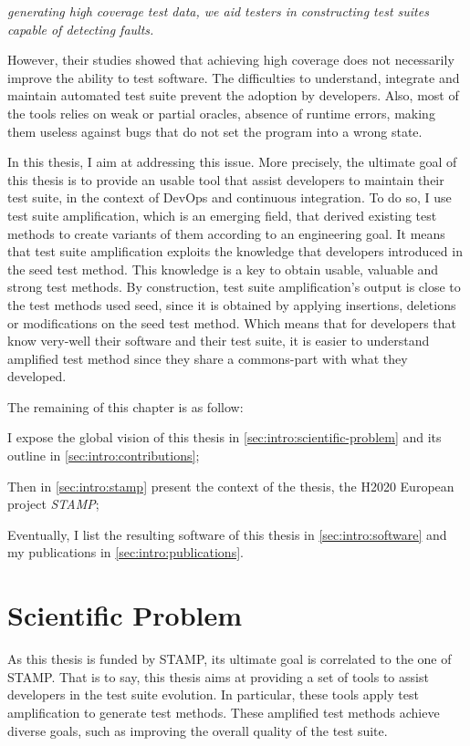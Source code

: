 \emph{generating high coverage test data, we aid testers in constructing test suites capable of detecting faults.}

However, their studies showed that achieving high coverage does not necessarily improve the ability to test software.
The difficulties to understand, integrate and maintain automated test suite prevent the adoption by developers.
Also, most of the tools relies on weak or partial oracles, \eg absence of runtime errors, making them useless against bugs that do not set the program into a wrong state.

In this thesis, I aim at addressing this issue.
More precisely, the ultimate goal of this thesis is to provide an usable tool that assist developers to maintain their test suite, in the context of DevOps and continuous integration.
To do so, I use test suite amplification, which is an emerging field, that derived existing test methods to create variants of them according to an engineering goal.
It means that test suite amplification exploits the knowledge that developers introduced in the seed test method.
This knowledge is a key to obtain usable, valuable and strong test methods.
By construction, test suite amplification's output is close to the test methods used seed, since it is obtained by applying insertions, deletions or modifications on the seed test method.
Which means that for developers that know very-well their software and their test suite, it is easier to understand amplified test method since they share a commons-part with what they developed.

The remaining of this chapter is as follow:

I expose the global vision  of this thesis in \autoref{sec:intro:scientific-problem} and its outline in \autoref{sec:intro:contributions};

Then in \autoref{sec:intro:stamp} present the context of the thesis, the H2020 European project \emph{STAMP};

Eventually, I list the resulting software of this thesis in \autoref{sec:intro:software} and my publications in \autoref{sec:intro:publications}.

\section{Scientific Problem}
\label{sec:intro:scientific-problem}

As this thesis is funded by STAMP, its ultimate goal is correlated to the one of STAMP.
That is to say, this thesis aims at providing a set of tools to assist developers in the test suite evolution.
In particular,  these tools apply test amplification to generate test methods.
These amplified test methods achieve diverse goals, such as improving the overall quality of the test suite.

